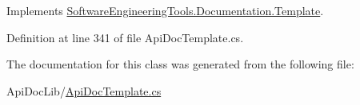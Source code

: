 Implements \hyperlink{class_software_engineering_tools_1_1_documentation_1_1_template_ab13b45a10b7eb65a0b6c15dbc1318664}{Software\+Engineering\+Tools.\+Documentation.\+Template}.



Definition at line 341 of file Api\+Doc\+Template.\+cs.



The documentation for this class was generated from the following file\+:\begin{DoxyCompactItemize}
\item 
Api\+Doc\+Lib/\hyperlink{_api_doc_template_8cs}{Api\+Doc\+Template.\+cs}\end{DoxyCompactItemize}
